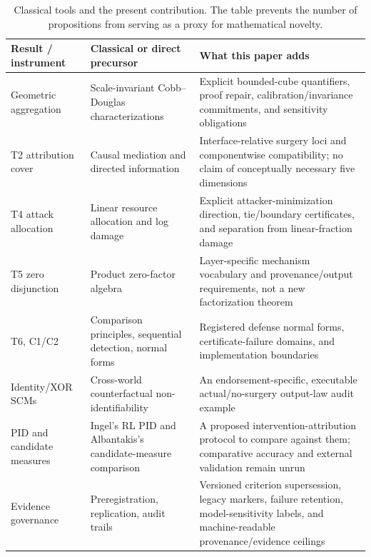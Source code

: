 \begin{table}[htbp]
\centering
\caption{Classical tools and the present contribution. The table prevents
the number of propositions from serving as a proxy for mathematical novelty.}
\label{tab:rw-novelty}
\footnotesize
\begin{tabularx}{\textwidth}{@{}>{\raggedright\arraybackslash}p{}
>{\raggedright\arraybackslash}p{}X@{}}
\toprule
Result / instrument & Classical or direct precursor & What this paper adds \\
\midrule
Geometric aggregation & Scale-invariant Cobb--Douglas characterizations
\citep{ebert_welsch2004,oecd2008} & Explicit bounded-cube quantifiers,
proof repair, calibration/invariance commitments, and sensitivity obligations \\
T2 attribution cover & Causal mediation and directed information
\citep{kramer2003,peters2017} & Interface-relative surgery loci and
componentwise compatibility; no claim of conceptually necessary five dimensions \\
T4 attack allocation & Linear resource allocation and log damage & Explicit
attacker-minimization direction, tie/boundary certificates, and separation
from linear-fraction damage \\
T5 zero disjunction & Product zero-factor algebra & Layer-specific mechanism
vocabulary and provenance/output requirements, not a new factorization theorem \\
T6, C1/C2 & Comparison principles, sequential detection, normal forms
\citep{lade_gross2012,kuznetsov2004} & Registered defense normal forms,
certificate-failure domains, and implementation boundaries \\
Identity/XOR SCMs & Cross-world counterfactual non-identifiability & An
endorsement-specific, executable actual/no-surgery output-law audit example \\
PID and candidate measures & Ingel's RL PID and Albantakis's candidate-measure
comparison \citep{ingel2022quantifying,albantakis2021quantifying} & A proposed
intervention-attribution protocol to compare against them; comparative
accuracy and external validation remain unrun \\
Evidence governance & Preregistration, replication, audit trails & Versioned
criterion supersession, legacy markers, failure retention, model-sensitivity
labels, and machine-readable provenance/evidence ceilings \\
\bottomrule
\end{tabularx}
\end{table}

